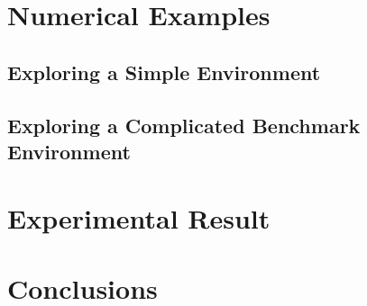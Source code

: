 \section{Numerical Examples}

\subsection{Exploring a Simple Environment}

\subsection{Exploring a Complicated Benchmark Environment}

\section{Experimental Result}

\section{Conclusions}


